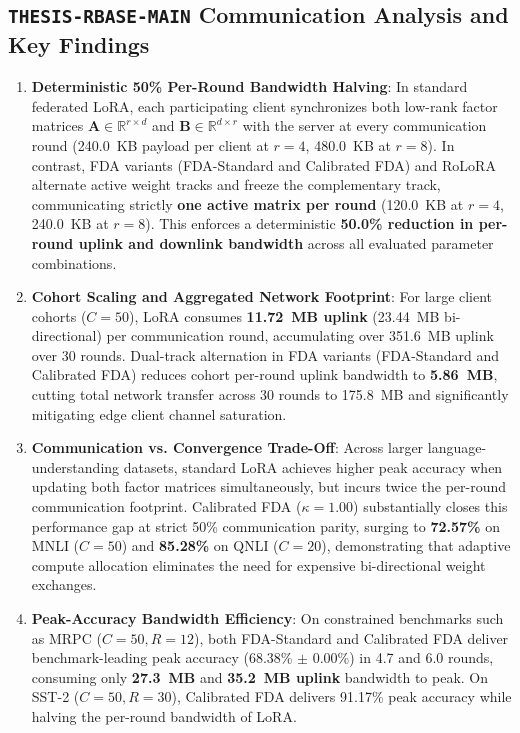 \documentclass[10pt,a4paper]{article}
\begin{document}
\subsection*{\texttt{THESIS-RBASE-MAIN} Communication Analysis and Key Findings}

\begin{enumerate}
    \item \textbf{Deterministic 50\% Per-Round Bandwidth Halving}: In standard federated LoRA, each participating client synchronizes both low-rank factor matrices $\mathbf{A} \in \mathbb{R}^{r \times d}$ and $\mathbf{B} \in \mathbb{R}^{d \times r}$ with the server at every communication round (240.0~KB payload per client at $r=4$, 480.0~KB at $r=8$). In contrast, FDA variants (FDA-Standard and Calibrated FDA) and RoLoRA alternate active weight tracks and freeze the complementary track, communicating strictly \textbf{one active matrix per round} (120.0~KB at $r=4$, 240.0~KB at $r=8$). This enforces a deterministic \textbf{50.0\% reduction in per-round uplink and downlink bandwidth} across all evaluated parameter combinations.
    \item \textbf{Cohort Scaling and Aggregated Network Footprint}: For large client cohorts ($C=50$), LoRA consumes \textbf{11.72~MB uplink} (23.44~MB bi-directional) per communication round, accumulating over 351.6~MB uplink over 30 rounds. Dual-track alternation in FDA variants (FDA-Standard and Calibrated FDA) reduces cohort per-round uplink bandwidth to \textbf{5.86~MB}, cutting total network transfer across 30 rounds to 175.8~MB and significantly mitigating edge client channel saturation.
    \item \textbf{Communication vs. Convergence Trade-Off}: Across larger language-understanding datasets, standard LoRA achieves higher peak accuracy when updating both factor matrices simultaneously, but incurs twice the per-round communication footprint. Calibrated FDA ($\kappa=1.00$) substantially closes this performance gap at strict 50\% communication parity, surging to \textbf{72.57\%} on MNLI ($C=50$) and \textbf{85.28\%} on QNLI ($C=20$), demonstrating that adaptive compute allocation eliminates the need for expensive bi-directional weight exchanges.
    \item \textbf{Peak-Accuracy Bandwidth Efficiency}: On constrained benchmarks such as MRPC ($C=50, R=12$), both FDA-Standard and Calibrated FDA deliver benchmark-leading peak accuracy (68.38\% $\pm$ 0.00\%) in 4.7 and 6.0 rounds, consuming only \textbf{27.3~MB} and \textbf{35.2~MB uplink} bandwidth to peak. On SST-2 ($C=50, R=30$), Calibrated FDA delivers 91.17\% peak accuracy while halving the per-round bandwidth of LoRA.

\end{enumerate}
\end{document}
